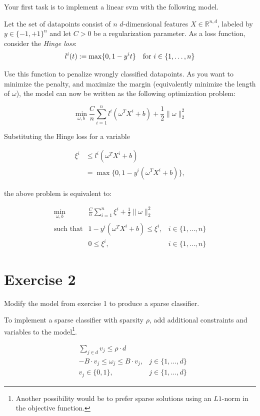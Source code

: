 \documentclass[11pt]{article}
\newcommand{\R}{\mathbb{R}}
\begin{document}
Your first task is to implement a linear svm with the following model.

Let the set of datapoints consist of $n$ $d$-dimensional features $X \in \R^{n,d}$, labeled by $y \in \{-1,+1\}^{n}$ and let $C > 0$ be a regularization parameter.
As a loss function, consider the \emph{Hinge loss}:
$$l^{i}(t) :=  \max \{0, 1 - y^i t\} \text{\quad for } i \in \{1,\dots, n\}$$

Use this function to penalize wrongly classified datapoints.
As you want to minimize the penalty, and maximize the margin (equivalently minimize the length of $\omega$), the model can now be written as the following optimization problem:

$$
\min\limits_{\omega, b}
\frac{C}{n} \sum\limits_{i = 1}^{n} l^i(\omega^{T}X^{i} + b)
+\frac{1}{2} \lVert \omega \rVert_{2}^{2}
$$

Substituting the Hinge loss for a variable

$$ \begin{aligned}
\xi^i &\leq l^i( \omega^T X^i + b ) \\
&= \max \{0, 1 - y^i (\omega^TX^i + b) \},
\end{aligned} $$

the above problem is equivalent to:

\begin{equation*}
\begin{array}{rll}
  \min\limits_{\omega, b}
  & \frac{C}{n} \sum\limits_{i = 1}^n \xi^i + \frac{1}{2} \lVert \omega \rVert_2^2
\\
  \text{such that}
  & 1 - y^i (\omega^T X^i +b) \leq \xi^i,
  & i \in \{1,\dots,n\}
\\
  & 0 \leq \xi^i,
  & i \in \{1,\dots, n\}
\end{array}
\end{equation*}

\section*{Exercise 2}

Modify the model from exercise 1 to produce a sparse classifier.

To implement a sparse classifier with sparsity $\rho$, add additional constraints and variables to the model\footnote{
  Another possibility would be to prefer sparse solutions using an $L1$-norm in the objective function.}.

\begin{equation*}
\begin{array}{rll}
  & \sum_{j \in d} v_{j} \leq \rho \cdot d
  &
\\
  & -B \cdot v_{j} \leq \omega_{j} \leq B \cdot v_{j},
  & j \in \{ 1, \dots, d \}
\\
  & v_{j} \in \{0,1\},
  & j \in \{1,\dots, d\}
\end{array}
\end{equation*}
\end{document}
